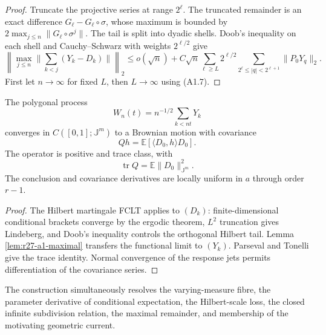 \begin{proof}
Truncate the projective series at range $2^\ell$.  The truncated remainder
is an exact difference $G_\ell-G_\ell\circ\sigma$, whose maximum is bounded by
$2\max_{j\le n}\|G_\ell\circ\sigma^j\|$.  The tail is split into dyadic
shells.  Doob's inequality on each shell and Cauchy--Schwarz with weights
$2^{\ell/2}$ give
\[
 \left\|\max_{j\le n}\Big\|\sum_{k<j}(Y_k-D_k)\Big\|\right\|_2
 \le o(\sqrt n)+C\sqrt n
 \sum_{\ell\ge L}2^{\ell/2}
 \sum_{2^\ell\le|q|<2^{\ell+1}}\|P_0Y_q\|_2.
\]
First let $n\to\infty$ for fixed $L$, then $L\to\infty$ using (A1.7).
\end{proof}

\begin{theorem}
\label{thm:r27-a1-fclt}
The polygonal process
\[
 W_n(t)=n^{-1/2}\sum_{k<nt}Y_k
\]
converges in $C([0,1];\mathbb J^m)$ to a Brownian motion with covariance
\[
 Qh=\mathbb E[\langle D_0,h\rangle D_0].
\]
The operator is positive and trace class, with
\[
 \operatorname{tr}Q=\mathbb E\|D_0\|_{\mathbb J^m}^2.
\]
The conclusion and covariance derivatives are locally uniform in $a$ through
order $r-1$.
\end{theorem}

\begin{proof}
The Hilbert martingale FCLT applies to $(D_k)$: finite-dimensional conditional
brackets converge by the ergodic theorem, $L^2$ truncation gives Lindeberg,
and Doob's inequality controls the orthogonal Hilbert tail.  Lemma
\ref{lem:r27-a1-maximal} transfers the functional limit to $(Y_k)$.  Parseval
and Tonelli give the trace identity.  Normal convergence of the response jets
permits differentiation of the covariance series.
\end{proof}

The construction simultaneously resolves the varying-measure fibre, the
parameter derivative of conditional expectation, the Hilbert-scale loss, the
closed infinite subdivision relation, the maximal remainder, and membership
of the motivating geometric current.
